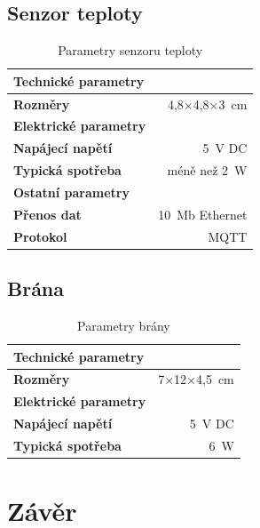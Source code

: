 \documentclass[12pt,a4paper]{article}
\begin{document}
\subsection{Senzor teploty}

\begin{table}[H]
  \centering
  \begin{tabular}{lr}
    \hline
    \textbf{Technické parametry} & ~ \\
    \hline
    \hline
    \textbf{Rozměry} & 4,8$\times$4,8$\times$3~cm \\
    \hline
    \textbf{Elektrické parametry} \\
    \hline
    \hline
    \textbf{Napájecí napětí} & 5~V DC\index[zkr]{DC!Direct current|textit} \\
    \textbf{Typická spotřeba} & méně než 2~W \\
    \hline
    \textbf{Ostatní parametry} \\
    \hline
    \hline
    \textbf{Přenos dat} & 10~Mb Ethernet \\
    \textbf{Protokol} & MQTT \\
  \end{tabular}
  \caption{Parametry senzoru teploty}\label{table:parametry/senzor}
\end{table}

\subsection{Brána}

\begin{table}[H]
  \centering
  \begin{tabular}{lr}
    \hline
    \textbf{Technické parametry} & ~ \\
    \hline
    \hline
    \textbf{Rozměry} & 7$\times$12$\times$4,5~cm \\
    \hline
    \textbf{Elektrické parametry} \\
    \hline
    \hline
    \textbf{Napájecí napětí} & 5~V DC \\
    \textbf{Typická spotřeba} & 6~W \\
  \end{tabular}
  \caption{Parametry brány}\label{table:parametry/zbrana}
\end{table}

\newpage

\section*{Závěr}
\end{document}

